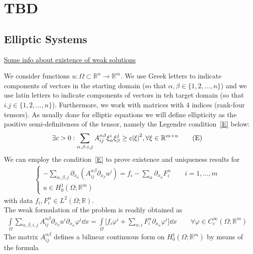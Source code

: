 \chapter{TBD}

\section{Elliptic Systems}
\underline{Some info about existence of weak solutions}

We consider functions \(u: \Omega \subset \mathbb{R}^{n} \to \mathbb{R}^{m}\). We use Greek letters to indicate components of vectors in the starting domain (so that \(\alpha,\beta \in \{1,2,\dots,n\} \)) and we use latin letters to indicate components of vectors in teh target domain (so that \(i.j \in \{1,2,\dots,n\} \)). Furthermore, we work with matrices with 4 indices (rank-four tensors). As usually done for elliptic equations we will define ellipticity as the positive semi-definiteness of the tensor, namely the Legendre condition~\eqref{E} below:
\begin{gather}
	\exists c > 0 : \sum_{\alpha,\beta,i,j} A_{ij}^{\alpha\beta} \xi_{\alpha}^{i} \xi_{\beta}^{j} \geq c \abs{\xi}^{2}, \forall \xi \in \mathbb{R}^{m \times n} \tag{E}\label{E}
\end{gather}
We can employ the condition~\eqref{E} to prove existence and uniqueness results for
\begin{gather}
	\begin{cases}
		- \sum_{\alpha, \beta, j} \partial_{x_\alpha} (A_{ij}^{\alpha \beta} \partial_{x_{\beta}} u^{j}) = f_{i} - \sum_{\alpha}^{} \partial_{x_{\alpha}} F_{i}^{\alpha}\qquad i=1,\dots,m \\
		u \in H_{0}^{1}(\Omega; \mathbb{R}^{m})
	\end{cases} \tag{LS}\label{LS}
\end{gather}
with data \(f_{i},F_{i}^{\alpha} \in L^{2}(\Omega;\mathbb{R})\).\\
The weak formulation of the problem is readily obtained as
\begin{gather}
	\int\limits_{\Omega}^{} \sum_{\alpha, \beta, i,j}^{} A_{ij}^{\alpha \beta} \partial_{x_{\beta}} u^{i} \partial_{x_{\alpha}} \varphi^{i} \dd{x} = \int\limits_{\Omega}^{} \Big[f_{i} \varphi^{i} + \sum_{\alpha,i}^{} F_{i}^{\alpha} \partial_{x_{\alpha}} \varphi^{i} \Big] \dd{x} \qquad \forall \varphi \in C_c^\infty(\Omega;\mathbb{R}^{m})
\end{gather}
The matrix \(A_{ij}^{\alpha \beta}\) defines a bilinear continuous form on \(H_0^1(\Omega;\mathbb{R}^{m})\) by means of the formula
